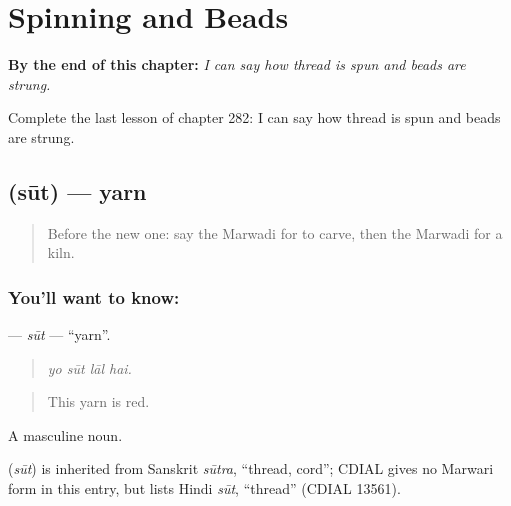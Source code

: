 
\chapter{Spinning and Beads}
\label{ch:mw-spinning-and-beads}

\begin{chapteropening}
\textbf{By the end of this chapter:} \emph{I can say how thread is spun and beads are strung.}

Complete the last lesson of chapter 282: I can say how thread is spun and beads are strung.
\end{chapteropening}

\section[\texorpdfstring{\mw{सूत} (sūt)}{सूत (sūt)}]{ (sūt) — yarn}

\label{lesson:MW-C282-sut}



\begin{quote}
Before the new one: say the Marwadi for to carve, then the Marwadi for a kiln.
\end{quote}

\subsection*{You'll want to know: }
\textbf{} — \emph{sūt} — \textquotedblleft{}yarn\textquotedblright{}.

\begin{quote}
   
\end{quote}

\begin{quote}
\emph{yo sūt lāl hai.}
\end{quote}

\begin{quote}
This yarn is red.
\end{quote}

A masculine noun.

\begin{cousinweb}
\textbf{} (\emph{sūt}) is inherited from Sanskrit \emph{sūtra}, \textquotedblleft{}thread, cord\textquotedblright{}; CDIAL gives no Marwari form in this entry, but lists Hindi \emph{sūt}, \textquotedblleft{}thread\textquotedblright{} (CDIAL 13561).
\end{cousinweb}

